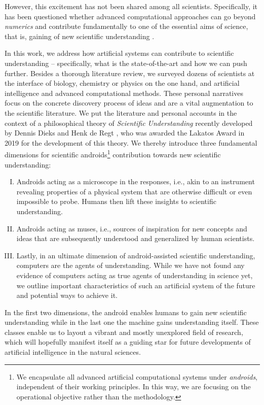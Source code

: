 However, this excitement has not been shared among all scientists. Specifically, it has been questioned whether advanced computational approaches can go beyond \textit{numerics} \cite{hoffmann2020simulationA, hoffmann2020simulationB, hoffmann2020simulationC, marcus2020next,thaler2021} and contribute fundamentally to one of the essential aims of science, that is, gaining of new scientific understanding \cite{potochnik2015diverse,potochnik2017idealization,de2017understanding}.

In this work, we address how artificial systems can contribute to scientific understanding -- specifically, what is the state-of-the-art and how we can push further. Besides a thorough literature review, we surveyed dozens of scientists at the interface of biology, chemistry or physics on the one hand, and artificial intelligence and advanced computational methods. These personal narratives focus on the concrete discovery process of ideas and are a vital augmentation to the scientific literature. We put the literature and personal accounts in the context of a philosophical theory of \textit{Scientific Understanding} recently developed by Dennis Dieks and Henk de Regt \cite{de2005contextual,de2017understanding}, who was awarded the Lakatos Award in 2019 for the development of this theory. We thereby introduce three fundamental dimensions for scientific androids\footnote{We encapsulate all advanced artificial computational systems under \textit{androids}, independent of their working principles. In this way, we are focusing on the operational objective rather than the methodology.} contribution towards new scientific understanding:
\begin{enumerate}[I)]
\item Androids acting as a microscope in the responses, i.e., akin to an instrument revealing properties of a physical system that are otherwise difficult or even impossible to probe. Humans then lift these insights to scientific understanding.
\item Androids acting as muses, i.e., sources of inspiration for new concepts and ideas that are subsequently understood and generalized by human scientists.
\item Lastly, in an ultimate dimension of android-assisted scientific understanding, computers are the agents of understanding. While we have not found any evidence of computers acting as true agents of understanding in science yet, we outline important characteristics of such an artificial system of the future and potential ways to achieve it.
\end{enumerate}
In the first two dimensions, the android enables humans to gain new scientific understanding while in the last one the machine gains understanding itself. These classes enable us to layout a vibrant and mostly unexplored field of research, which will hopefully manifest itself as a guiding star for future developments of artificial intelligence in the natural sciences.

